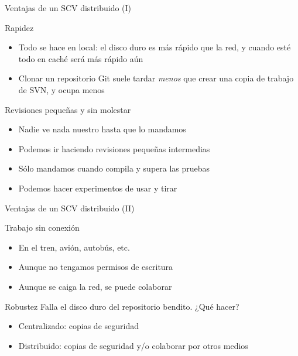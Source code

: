 \documentclass[compress,xcolor=svgnames]{beamer}
\begin{document}
\begin{frame}{Ventajas de un SCV distribuido (I)}

  \begin{block}{Rapidez}
    \begin{itemize}
    \item Todo se hace en local: el disco duro es más rápido que la
      red, y cuando esté todo en caché será más rápido aún
    \item Clonar un repositorio Git suele tardar \emph{menos} que
      crear una copia de trabajo de SVN, y ocupa menos
    \end{itemize}
  \end{block}

  \pause

  \begin{block}{Revisiones pequeñas y sin molestar}
    \begin{itemize}
    \item Nadie ve nada nuestro hasta que lo mandamos
    \item Podemos ir haciendo revisiones pequeñas intermedias
    \item Sólo mandamos cuando compila y supera las pruebas
    \item Podemos hacer experimentos de usar y tirar
    \end{itemize}
  \end{block}

\end{frame}

\begin{frame}{Ventajas de un SCV distribuido (II)}
  \begin{block}{Trabajo sin conexión}
    \begin{itemize}
    \item En el tren, avión, autobús, etc.
    \item Aunque no tengamos permisos de escritura
    \item Aunque se caiga la red, se puede colaborar
    \end{itemize}
  \end{block}

  \pause

  \begin{block}{Robustez}
    Falla el disco duro del repositorio bendito. ¿Qué hacer?
    \begin{itemize}
    \item Centralizado: copias de seguridad
    \item Distribuido: copias de seguridad y/o colaborar por otros medios
    \end{itemize}
  \end{block}
\end{frame}
\end{document}

